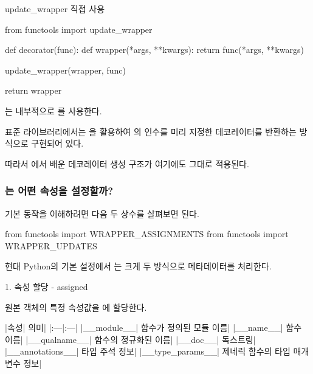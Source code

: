 \begin{dhknote}
\begin{dhksmry}[centered]
update_wrapper 직접 사용
\end{dhksmry}
\end{dhknote}

\begin{dhkcode}
from functools import update_wrapper

def decorator(func):
    def wrapper(*args, **kwargs):
        return func(*args, **kwargs)

    update_wrapper(wrapper, func)

    return wrapper
\end{dhkcode}

는 내부적으로 를 사용한다.

표준 라이브러리에서는 을 활용하여 의  인수를 미리 지정한 데코레이터를 반환하는 방식으로 구현되어 있다.

따라서 에서 배운 데코레이터 생성 구조가 여기에도 그대로 적용된다.

\subsubsection{는 어떤 속성을 설정할까?}

기본 동작을 이해하려면 다음 두 상수를 살펴보면 된다.

\begin{dhkcode}
from functools import WRAPPER_ASSIGNMENTS
from functools import WRAPPER_UPDATES
\end{dhkcode}

현대 Python의 기본 설정에서 는 크게 두 방식으로 메타데이터를 처리한다.

\begin{dhknote}
\begin{dhksmry}[centered]
1. 속성 할당 - assigned
\end{dhksmry}
\end{dhknote}

원본 객체의 특정 속성값을 에 할당한다.

\begin{dhktable}
|속성|	의미|
|:---|:---|
|__module__|	함수가 정의된 모듈 이름|
|__name__|	함수 이름|
|__qualname__|	함수의 정규화된 이름|
|__doc__|	독스트링|
|__annotations__|	타입 주석 정보|
|__type_params__|	제네릭 함수의 타입 매개변수 정보|
\end{dhktable}

